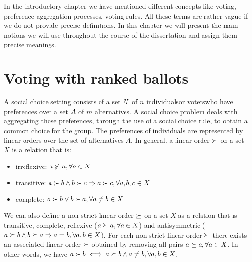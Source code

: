 In the introductory chapter we have mentioned different concepts like voting, preference aggregation processes, voting rules. All these terms are rather vague if we do not provide precise definitions.
In this chapter we will present the main notions we will use throughout the course of the dissertation and assign them precise meanings.

\section{Voting with ranked ballots}

A social choice setting consists of a set $N$ of $n$ individuals\textemdash or voters\textemdash who have preferences over a set $A$ of $m$ alternatives.
A social choice problem deals with aggregating those preferences, through the use of a social choice rule, to obtain a common choice for the group.
The preferences of individuals are represented by linear orders over the set of alternatives $A$.
In general, a linear order $\mathbin{\succ}$ on a set $X$ is a relation that is:
\vspace{-0.3em}
\begin{itemize}
	\itemsep-0.5em 
	\item irreflexive: $a \not\succ a, \forall a \in X$
	\item transitive: $a \succ b \land b \succ c \Rightarrow a \succ c, \forall a,b,c \in X$
	\item complete: $a \succ b \lor b \succ a, \forall a \neq b \in X$
\end{itemize} 
\vspace{-0.3em}
We can also define a non-strict linear order $\mathbin{\succeq}$ on a set $X$ as a relation that is transitive, complete, reflexive ($a \succeq a, \forall a \in X$) and antisymmetric ($a \succeq b \land b \succeq a \Rightarrow a = b, \forall a,b \in X$).
For each non-strict linear order $\succeq$ there exists an associated linear order $\succ$ obtained by removing all pairs $a \succeq a, \forall a \in X$. In other words, we have $a \succ b \iff a \succeq b \land a \neq b, \forall a,b \in X$.

